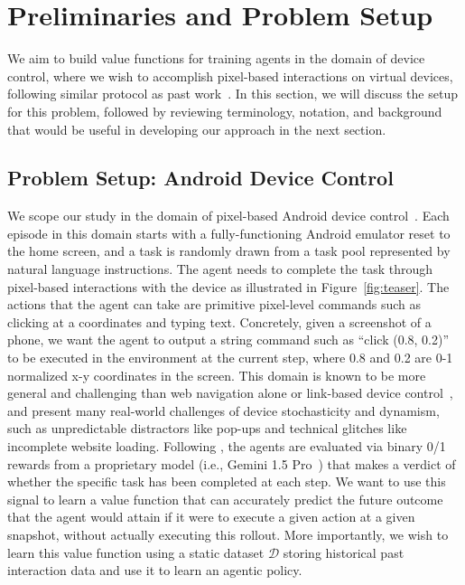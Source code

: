 \vspace{-0.2cm}
\section{Preliminaries and Problem Setup}
\label{sec:prelims}
\vspace{-0.1cm}

We aim to build value functions for training agents in the domain of device control, where we wish to accomplish pixel-based interactions on virtual devices, following similar protocol as past work~\citep{bai2024digirltraininginthewilddevicecontrol}. In this section, we will discuss the setup for this problem, followed by reviewing terminology, notation, and background that would be useful in developing our approach in the next section.

\vspace{-0.2cm}
\subsection{Problem Setup: Android Device Control}
\vspace{-0.1cm}
We scope our study in the domain of pixel-based Android device control~\citep{bai2024digirltraininginthewilddevicecontrol, zhang2023appagentmultimodalagentssmartphone, rawles2023androidwildlargescaledataset}. Each episode in this domain starts with a fully-functioning Android emulator reset to the home screen, and a task is randomly drawn from a task pool represented by natural language instructions. The agent needs to complete the task through pixel-based interactions with the device as illustrated in Figure~\ref{fig:teaser}. The actions that the agent can take are primitive pixel-level commands such as clicking at a coordinates and typing text. Concretely, given a screenshot of a phone, we want the agent to output a string command such as ``click (0.8, 0.2)'' to be executed in the environment at the current step, where 0.8 and 0.2 are 0-1 normalized x-y coordinates in the screen. This domain is known to be more general and challenging than web navigation alone or link-based device control~\citep{bai2024digirltraininginthewilddevicecontrol},
and present many real-world challenges of device stochasticity and dynamism, such as unpredictable distractors like pop-ups and technical glitches like incomplete website loading. Following \citet{pan2024autonomousevaluationrefinementdigital,bai2024digirltraininginthewilddevicecontrol}, the agents are evaluated via binary 0/1 rewards from a proprietary model (i.e., Gemini 1.5 Pro~\citep{geminiteam2024geminifamilyhighlycapable}) that makes a verdict of whether the specific task has been completed at each step. We want to use this signal to learn a value function that can accurately predict the future outcome that the agent would attain if it were to execute a given action at a given snapshot, without actually executing this rollout. More importantly, we wish to learn this value function using a static dataset $\mathcal{D}$ storing historical past interaction data and use it to learn an agentic policy.

